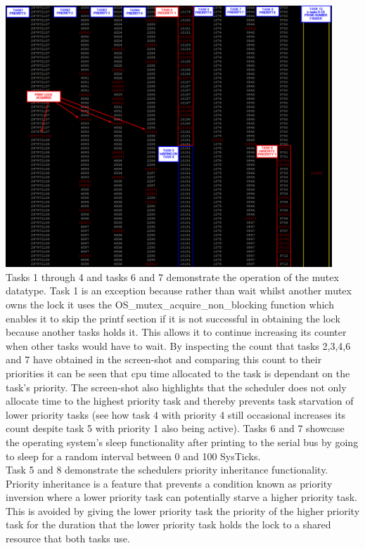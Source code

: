 \documentclass[12pt,a4paper]{article}
\begin{document}
\includegraphics[width=0.92\textwidth]{images/priorityInheritance.png}\\

Tasks 1 through 4 and tasks 6 and 7 demonstrate the operation of the mutex datatype. Task 1 is an exception because rather than wait whilst another mutex owns the lock it uses the OS\_mutex\_acquire\_non\_blocking function which enables it to skip the printf section if it is not successful in obtaining the lock because another tasks holds it. This allows it to continue increasing its counter when other tasks would have to wait. By inspecting the count that tasks 2,3,4,6 and 7 have obtained in the screen-shot and comparing this count to their priorities it can be seen that cpu time allocated to the task is dependant on the task's priority. The screen-shot also highlights that the scheduler does not only allocate time to the highest priority task and thereby prevents task starvation of lower priority tasks (see how task 4 with priority 4 still occasional increases its count despite task 5 with priority 1 also being active). Tasks 6 and 7 showcase the operating system's sleep functionality after printing to the serial bus by going to sleep for a random interval between 0 and 100 SysTicks.\\

Task 5 and 8 demonstrate the schedulers priority inheritance functionality. Priority inheritance is a feature that prevents a condition known as priority inversion where a lower priority task can potentially starve a higher priority task. This is avoided by giving the lower priority task the priority of the higher priority task for the duration that the lower priority task holds the lock to a shared resource that both tasks use. \\
\end{document}
